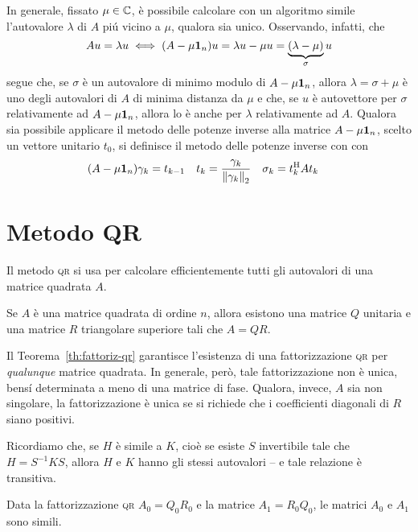 	In generale, fissato \(\mu \in \mathbb{C}\), è possibile calcolare con un algoritmo simile l'autovalore \(\lambda\) di \(A\) piú vicino a \(\mu\), qualora sia unico. Osservando, infatti, che
	\begin{equation*}
		A u = \lambda u \iff (A - \mu \mathbf{1}_n) u = \lambda u - \mu u = \underbrace{(\lambda - \mu)}_{\sigma} u
	\end{equation*}
	segue che, se \(\sigma\) è un autovalore di minimo modulo di \(A - \mu \mathbf{1}_n\), allora \(\lambda = \sigma + \mu\) è uno degli autovalori di \(A\) di minima distanza da \(\mu\) e che, se \(u\) è autovettore per \(\sigma\) relativamente ad \(A - \mu \mathbf{1}_n\), allora lo è anche per \(\lambda\) relativamente ad \(A\). Qualora sia possibile applicare il metodo delle potenze inverse alla matrice \(A - \mu \mathbf{1}_n\), scelto un vettore unitario \(t_0\), si definisce il metodo delle potenze inverse con  con
	\begin{align}
		(A - \mu \mathbf{1}_n) \gamma_k &= t_{k - 1} &
		t_k &= \frac{\gamma_k}{\norm{\gamma_k}_2} &
		\sigma_k &= t_k^\mathrm{H}\relax A t_k
	\end{align}

\section{Metodo QR}
	
	\noindent Il metodo \textsc{qr} si usa per calcolare efficientemente tutti gli autovalori di una matrice quadrata \(A\).
	
	\begin{teorema}\label{th:fattoriz-qr}
		Se \(A\) è una matrice quadrata di ordine \(n\), allora esistono una matrice \(Q\) unitaria e una matrice \(R\) triangolare superiore tali che \(A = Q R\).
	\end{teorema}
	
	Il Teorema~\ref{th:fattoriz-qr} garantisce l'esistenza di una fattorizzazione \textsc{qr} per \emph{qualunque} matrice quadrata. In generale, però, tale fattorizzazione non è unica, bensí determinata a meno di una matrice di fase. Qualora, invece, \(A\) sia non singolare, la fattorizzazione è unica se si richiede che i coefficienti diagonali di \(R\) siano positivi.
	
	Ricordiamo che, se \(H\) è simile a \(K\), cioè se esiste \(S\) invertibile tale che \(H = S^{-1} K S\), allora \(H\) e \(K\) hanno gli stessi autovalori -- e tale relazione è transitiva.
	
	\begin{lemma}\label{lem:a0-a1-simili}
		Data la fattorizzazione \textsc{qr} \(A_0 = Q_0 R_0\) e la matrice \(A_1 = R_0 Q_0\), le matrici \(A_0\) e \(A_1\) sono simili.
	\end{lemma}
	
